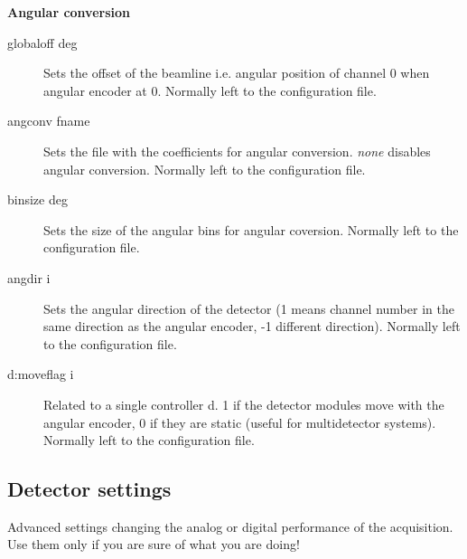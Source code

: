 \documentclass{article}
\begin{document}
\textbf{Angular conversion}

\begin{description}
\item[globaloff deg]   Sets the  offset  of the beamline i.e. angular position of channel 0 when angular encoder at 0. Normally left to the configuration file.
\item[angconv fname]  Sets the file with the coefficients for angular conversion. \textit{none} disables angular conversion.   Normally left to the configuration file. 
\item[binsize deg] Sets the size of the angular bins for angular coversion.  Normally left to the configuration file. 
\item[angdir i] Sets the angular direction of the detector (1 means channel number in the same direction as the angular encoder, -1 different direction).  Normally left to the configuration file.
\item[d:moveflag i]  Related to a single controller d. 1 if the detector modules move with the angular encoder, 0 if they are static (useful for multidetector systems). Normally left to the configuration file.
\end{description}



\subsection{Detector settings}
Advanced settings changing the analog or digital performance of the acquisition. Use them only if you are sure of what you are doing!
\end{document}
